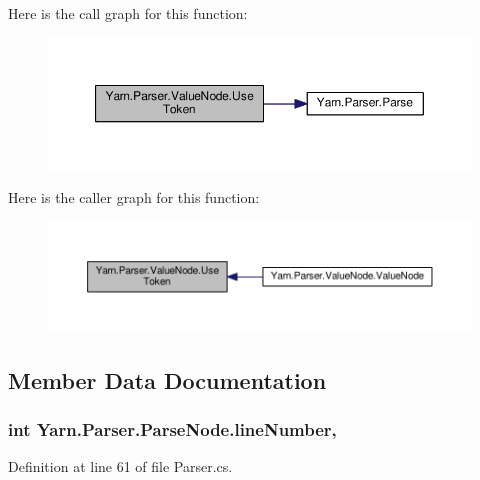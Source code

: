 Here is the call graph for this function\-:
\nopagebreak
\begin{figure}[H]
\begin{center}
\leavevmode
\includegraphics[width=350pt]{a00182_a7be6a979ee21b2d07ce541fb9c5b52df_cgraph}
\end{center}
\end{figure}




Here is the caller graph for this function\-:
\nopagebreak
\begin{figure}[H]
\begin{center}
\leavevmode
\includegraphics[width=350pt]{a00182_a7be6a979ee21b2d07ce541fb9c5b52df_icgraph}
\end{center}
\end{figure}




\subsection{Member Data Documentation}
\hypertarget{a00142_a18b493382de0fde5b4299c1bd2250075}{
\subsubsection[{line\-Number}]{\setlength{\rightskip}{0pt plus 5cm}int Yarn.\-Parser.\-Parse\-Node.\-line\-Number\hspace{0.3cm}{\ttfamily [package]}, {\ttfamily [inherited]}}}\label{a00142_a18b493382de0fde5b4299c1bd2250075}


Definition at line 61 of file Parser.\-cs.



